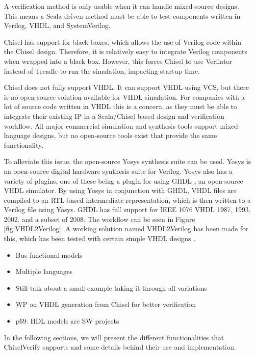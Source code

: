 \documentclass[conference]{IEEEtran}
\begin{document}
A verification method is only usable when it can handle mixed-source designs.
This means a Scala driven method must be able to test components written in Verilog,
VHDL, and SystemVerilog.

Chisel has support for black boxes, which allows the use of Verilog code within the Chisel design.
Therefore, it is relatively easy to integrate Verilog components when wrapped into a black box.
However, this forces Chisel to use Verilator instead of Treadle to run the simulation, impacting
startup time.

Chisel does not fully support VHDL. It can support VHDL using VCS, but there is no
open-source solution available for VHDL simulation. For companies with a lot of source code written in VHDL this is a concern, as they must be able to integrate their existing IP in a Scala/Chisel based design and verification workflow.
All major commercial simulation and synthesis tools support mixed-language designs, but no open-source tools exist that provide the same functionality.

To alleviate this issue, the open-source Yosys synthesis suite \cite{Yosys} can be used. Yosys is an open-source digital hardware synthesis suite for Verilog. Yosys also has a variety of plugins, one of these being a plugin for using GHDL \cite{ghdl}, an open-source VHDL simulator. By using Yosys in conjunction with GHDL, VHDL files are compiled to an RTL-based intermediate representation, which is then written to a Verilog file using Yosys. GHDL has full support for IEEE 1076 VHDL 1987, 1993, 2002, and a subset of 2008. The workflow can be seen in Figure \ref{fig:VHDL2Verilog}. A working solution named VHDL2Verilog has been made for this, which has been tested with certain simple VHDL designs \cite{vhdl2verilog}.



\begin{itemize}
\item Bus functional models
\item Multiple languages
\item Still talk about a small example taking it through all variations
\item WP on VHDL generation from Chisel for better verification
\item p69: HDL models are SW projects
\end{itemize}


In the following sections, we will present the different functionalities that ChiselVerify supports and some details behind their use and implementation.
\end{document}
